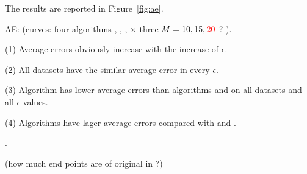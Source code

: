 The results are reported in Figure~\ref{fig:ae}.

AE: (\textcolor[rgb]{0.00,0.07,1.00}{curves: four algorithms \cist, \cista, \dpa, \squishe  $\times$  three $M = 10, 15, \textcolor[rgb]{1.00,0.00,0.00}{20}$ ? }).

\ni(1) Average errors obviously increase with the increase of $\epsilon$.

\ni(2) All datasets have the similar average \sed error in every $\epsilon$.

\ni(3) Algorithm \squishe has lower average errors than algorithms \dpa and \cist on all datasets and all $\epsilon$ values.

\ni(4) Algorithms \cist have lager average errors compared with \dpa and \squishe.

.

\textcolor[rgb]{1.00,0.00,0.00}{(how much end points are of original in \cista?)}





